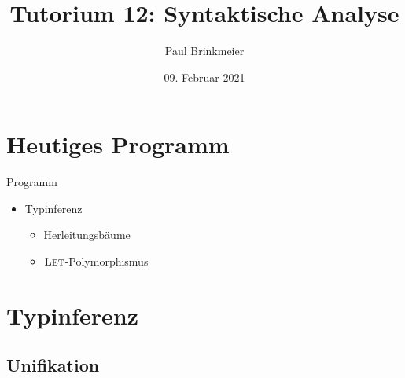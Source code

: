 \documentclass{beamer}
\title{Tutorium 12: Syntaktische Analyse}
\author{Paul Brinkmeier}
\institute{Tutorium Programmierparadigmen am KIT}
\date{09. Februar 2021}
\begin{document}
\begin{frame}
	\titlepage
\end{frame}

\section{Heutiges Programm}

\begin{frame}{Programm}
	\begin{itemize}
          \item Typinferenz
          \begin{itemize}
            \item Herleitungsbäume
            \item $\textsc{Let}$-Polymorphismus
          \end{itemize}
	\end{itemize}
\end{frame}

\section{Typinferenz}

\subsection{Unifikation}

{

}
\end{document}
